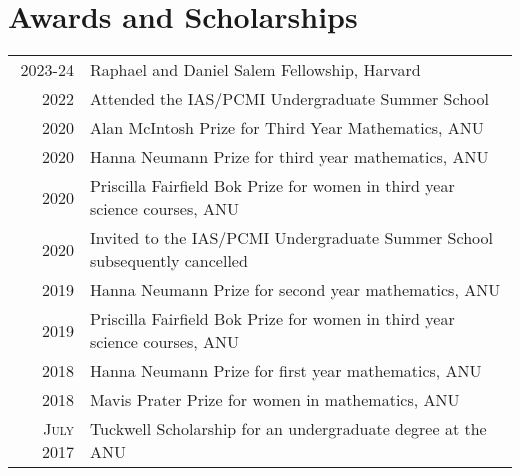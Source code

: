 \documentclass[a4paper,11pt]{article} %
\begin{document}

\section{Awards and Scholarships}

\begin{tabular}{rl}
2023-24 & Raphael and Daniel Salem Fellowship, \footnotesize Harvard \normalsize\\

2022 & Attended the IAS/PCMI Undergraduate Summer School\\

2020 & Alan McIntosh Prize \footnotesize for Third Year Mathematics, ANU \normalsize\\

2020 & Hanna Neumann Prize \footnotesize for third year mathematics, ANU \normalsize\\

2020 & Priscilla Fairfield Bok Prize \footnotesize for women in third year science courses, ANU \normalsize\\

2020 & Invited to the IAS/PCMI Undergraduate Summer School \footnotesize subsequently cancelled\\

2019 & Hanna Neumann Prize \footnotesize for second year mathematics, ANU \normalsize\\

2019 & Priscilla Fairfield Bok Prize \footnotesize for women in third year science courses, ANU \normalsize\\

2018 & Hanna Neumann Prize \footnotesize for first year mathematics, ANU \normalsize\\

2018 & Mavis Prater Prize \footnotesize for women in mathematics, ANU \normalsize\\

\textsc{July} 2017 & Tuckwell Scholarship \footnotesize for an undergraduate degree at the ANU\\

\end{tabular}

\end{document}
